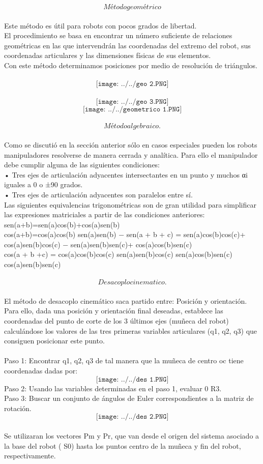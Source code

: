 \documentclass[12pt,a4paper]{article}
\begin{document}
$$Método geométrico$$\\

Este método es útil para robots con pocos grados de libertad.\\
El procedimiento se basa en encontrar un número suficiente de relaciones geométricas en las que intervendrán las coordenadas del extremo del robot, sus coordenadas articulares y las dimensiones físicas de sus elementos.\\
Con este método determinamos posiciones por medio de resolución de triángulos.\\
\\
$$\texttt{[image: ../../geo 2.PNG]} $$
\\
$$\texttt{[image: ../../geo 3.PNG]} $$
$$\texttt{[image: ../../geometrico 1.PNG]} $$
\\
$$Método  algebraico.$$\\
 Como se discutió en la sección anterior sólo en casos especiales pueden los robots manipuladores resolverse de manera cerrada y analítica. Para ello el manipulador debe cumplir alguna de las siguientes condiciones: \\
• Tres ejes de articulación adyacentes intersectantes en un punto y muchos αi iguales a 0 o ±90 grados.\\
 • Tres ejes de articulación adyacentes son paralelos entre sí.\\
Las siguientes equivalencias trigonométricas son de gran utilidad para simplificar las expresiones matriciales a partir de las condiciones anteriores:\\
 sen(a+b)=sen(a)cos(b)+cos(a)sen(b)\\
cos(a+b)=cos(a)cos(b) sen(a)sen(b) − sen(a + b + c) = sen(a)cos(b)cos(c)+ cos(a)sen(b)cos(c) − sen(a)sen(b)sen(c)+ cos(a)cos(b)sen(c) \\
cos(a + b +c) = cos(a)cos(b)cos(c) sen(a)sen(b)cos(c) sen(a)cos(b)sen(c) cos(a)sen(b)sen(c) \\
\\
$$Desacoplo cinematico.$$\\
El método de desacoplo cinemático saca partido entre: Posición y orientación. Para ello, dada una posición y orientación final deseadas, establece las coordenadas del punto de corte de los 3 últimos ejes (muñeca del robot) calculándose los valores de las tres primeras variables articulares (q1, q2, q3) que consiguen posicionar este punto.\\
\\
Paso 1: Encontrar q1, q2, q3 de tal manera que la muñeca de centro oc tiene coordenadas dadas por:\\
$$\texttt{[image: ../../des 1.PNG]} $$
Paso 2: Usando las variables determinadas en el paso 1, evaluar 0 R3.\\
Paso 3: Buscar un conjunto de ángulos de Euler correspondientes a la matriz de rotación.\\
$$\texttt{[image: ../../des 2.PNG]} $$
\\
Se utilizaran los vectores Pm y Pr, que van desde el origen del sistema asociado a la base del robot ( S0) hasta los puntos centro de la muñeca y fin del robot, respectivamente.\\
\end{document}
